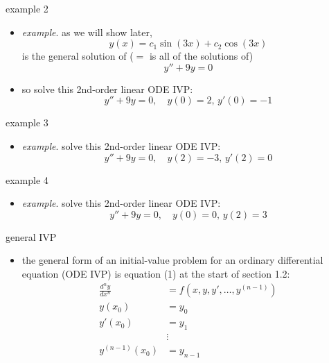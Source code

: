 \documentclass{beamer}
\begin{document}
\begin{frame}{example 2}

\begin{itemize}
\item \emph{example}.  as we will show later,
    $$y(x) = c_1 \sin(3x) + c_2 \cos(3x)$$
is the general solution of ($=$ is all of the solutions of)
    $$y'' + 9 y = 0$$
\item so solve this 2nd-order linear ODE IVP:
    $$y'' + 9y = 0, \quad y(0)=2, \, y'(0)=-1$$
\end{itemize}

\vspace{25mm}
\end{frame}


\begin{frame}{example 3}

\begin{itemize}
\item \emph{example}.  solve this 2nd-order linear ODE IVP:
    $$y'' + 9y = 0, \quad y(2)=-3, \, y'(2)=0$$
\end{itemize}

\vspace{40mm}
\end{frame}


\begin{frame}{example 4}

\begin{itemize}
\item \emph{example}.  solve this 2nd-order linear ODE IVP:
    $$y'' + 9y = 0, \quad y(0)=0, \, y(2)=3$$
\end{itemize}

\vspace{40mm}
\end{frame}


\begin{frame}{general IVP}

\begin{itemize}
\item the general form of an initial-value problem for an ordinary differential equation (ODE IVP) is equation (1) at the start of section 1.2:
\begin{align*}
\frac{d^n y}{dx^n} &= f(x,y,y',\dots,y^{(n-1)}) \\
y(x_0) &= y_0 \\
y'(x_0) &= y_1 \\
   &\vdots \\
y^{(n-1)}(x_0) &= y_{n-1}
\end{align*}
\end{itemize}
\end{frame}
\end{document}

